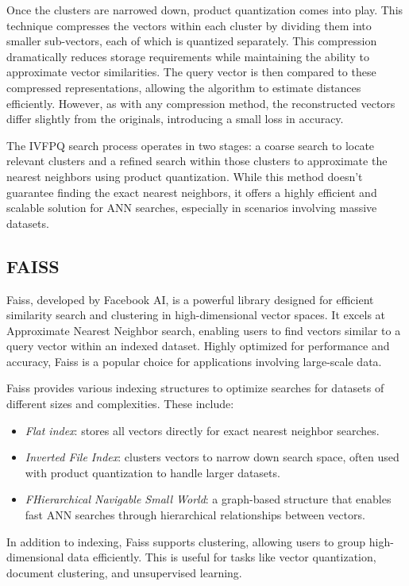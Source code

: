 \begin{itemize}
        Once the clusters are narrowed down, product quantization comes into play. 
        This technique compresses the vectors within each cluster by dividing them into smaller sub-vectors, each of which is quantized separately. 
        This compression dramatically reduces storage requirements while maintaining the ability to approximate vector similarities. 
        The query vector is then compared to these compressed representations, allowing the algorithm to estimate distances efficiently.
        However, as with any compression method, the reconstructed vectors differ slightly from the originals, introducing a small loss in accuracy.

        The IVFPQ search process operates in two stages: a coarse search to locate relevant clusters and a refined search within those clusters to approximate the nearest neighbors using product quantization. 
        While this method doesn't guarantee finding the exact nearest neighbors, it offers a highly efficient and scalable solution for ANN searches, especially in scenarios involving massive datasets.
\end{itemize}

\subsection{FAISS}
Faiss, developed by Facebook AI, is a powerful library designed for efficient similarity search and clustering in high-dimensional vector spaces. 
It excels at Approximate Nearest Neighbor search, enabling users to find vectors similar to a query vector within an indexed dataset. 
Highly optimized for performance and accuracy, Faiss is a popular choice for applications involving large-scale data.

Faiss provides various indexing structures to optimize searches for datasets of different sizes and complexities. 
These include:
\begin{itemize}
    \item \textit{Flat index}: stores all vectors directly for exact nearest neighbor searches.
    \item \textit{Inverted File Index}: clusters vectors to narrow down search space, often used with product quantization to handle larger datasets.
    \item \textit{FHierarchical Navigable Small World}: a graph-based structure that enables fast ANN searches through hierarchical relationships between vectors.
\end{itemize}
\noindent In addition to indexing, Faiss supports clustering, allowing users to group high-dimensional data efficiently. 
This is useful for tasks like vector quantization, document clustering, and unsupervised learning.

